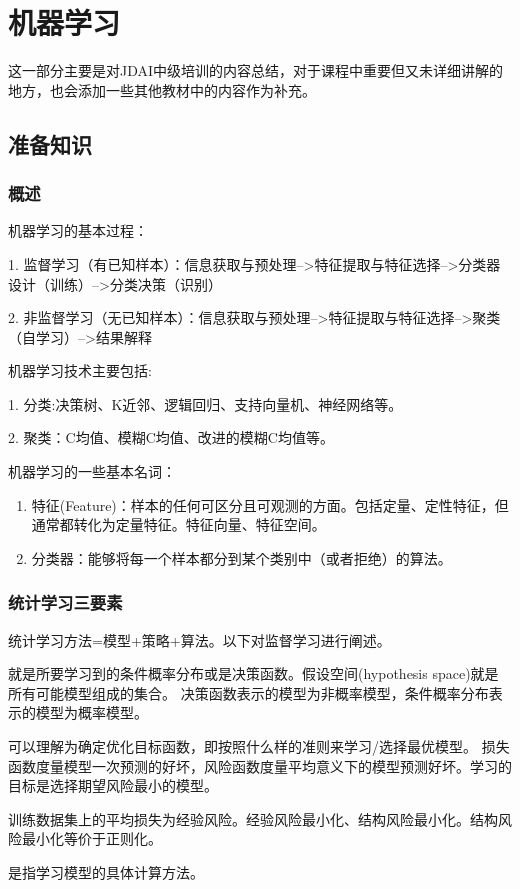 \chapter{机器学习}
这一部分主要是对JDAI中级培训的内容总结，对于课程中重要但又未详细讲解的地方，也会添加一些其他教材中的内容作为补充。

\section{准备知识}
\subsection{概述}
机器学习的基本过程：

1. 监督学习（有已知样本）：信息获取与预处理-->特征提取与特征选择-->分类器设计（训练）-->分类决策（识别）

2. 非监督学习（无已知样本）：信息获取与预处理-->特征提取与特征选择-->聚类（自学习）-->结果解释

机器学习技术主要包括:

1. 分类:决策树、K近邻、逻辑回归、支持向量机、神经网络等。

2. 聚类：C均值、模糊C均值、改进的模糊C均值等。

机器学习的一些基本名词：
\begin{enumerate}
\item 特征(Feature)：样本的任何可区分且可观测的方面。包括定量、定性特征，但通常都转化为定量特征。特征向量、特征空间。
\item 分类器：能够将每一个样本都分到某个类别中（或者拒绝）的算法。
\end{enumerate}

\subsection{统计学习三要素}
统计学习方法=模型+策略+算法。以下对监督学习进行阐述。

{}就是所要学习到的条件概率分布或是决策函数。假设空间(hypothesis space)就是所有可能模型组成的集合。
决策函数表示的模型为非概率模型，条件概率分布表示的模型为概率模型。

{}可以理解为确定优化目标函数，即按照什么样的准则来学习/选择最优模型。
损失函数度量模型一次预测的好坏，风险函数度量平均意义下的模型预测好坏。学习的目标是选择期望风险最小的模型。

训练数据集上的平均损失为经验风险。经验风险最小化、结构风险最小化。结构风险最小化等价于正则化。

{}是指学习模型的具体计算方法。


